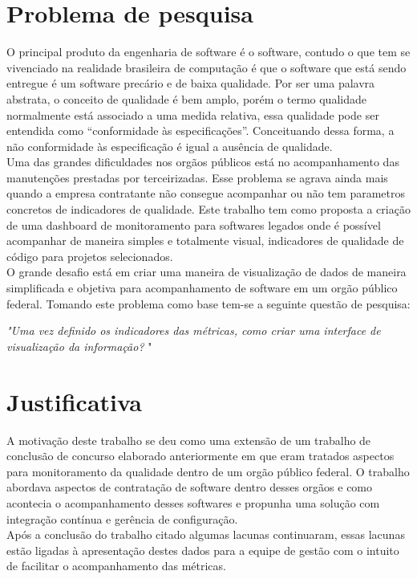 \section{Problema de pesquisa}
O principal produto da engenharia de software é o software, contudo o que tem se vivenciado na realidade brasileira de computação é que o software que está sendo entregue é um software precário e de baixa qualidade. Por ser uma palavra abstrata, o conceito de qualidade é bem amplo, porém o termo qualidade normalmente está associado a uma medida relativa, essa qualidade pode ser entendida como “conformidade às especificações”. Conceituando dessa forma, a não conformidade às especificação é igual a ausência de qualidade.
	\\Uma das grandes dificuldades nos orgãos públicos está no acompanhamento das manutenções prestadas por terceirizadas. Esse problema se agrava ainda mais quando a empresa contratante não consegue acompanhar ou não tem parametros concretos de indicadores de qualidade. Este trabalho tem como proposta a criação de uma dashboard de monitoramento para softwares legados onde é possível acompanhar de maneira simples e totalmente visual, indicadores de qualidade de código para projetos selecionados.
	\\O grande desafio está em criar uma maneira de visualização de dados de maneira simplificada e objetiva para acompanhamento de software em um orgão público federal. Tomando este problema como base tem-se a seguinte questão de pesquisa:
	
	\begin{center}
	\textit{"Uma vez definido os indicadores das métricas, como criar uma interface de visualização da informação? }"	
	\end{center}

\section{Justificativa}

	A motivação deste trabalho se deu como uma extensão de um trabalho de conclusão de concurso elaborado anteriormente em que eram tratados aspectos para monitoramento da qualidade dentro de um orgão público federal. O trabalho abordava aspectos de contratação de software dentro desses orgãos e como acontecia o acompanhamento desses softwares e propunha uma solução com integração contínua e gerência de configuração.
	\\Após a conclusão do trabalho citado algumas lacunas continuaram, essas lacunas estão ligadas à apresentação destes dados para a equipe de gestão com o intuito de facilitar o acompanhamento das métricas.


